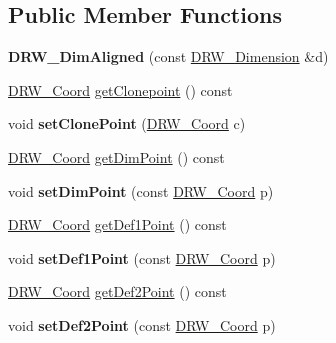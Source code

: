 \subsection*{Public Member Functions}
\begin{DoxyCompactItemize}
\item 
\hypertarget{classDRW__DimAligned_ac5b5e2750a3a6bb946ad2aacf7d8139a}{{\bfseries D\-R\-W\-\_\-\-Dim\-Aligned} (const \hyperlink{classDRW__Dimension}{D\-R\-W\-\_\-\-Dimension} \&d)}\label{classDRW__DimAligned_ac5b5e2750a3a6bb946ad2aacf7d8139a}

\item 
\hyperlink{classDRW__Coord}{D\-R\-W\-\_\-\-Coord} \hyperlink{classDRW__DimAligned_abbd897f18dec2dcded4a6c28ac08ae69}{get\-Clonepoint} () const 
\item 
\hypertarget{classDRW__DimAligned_af0c9c0fe499f3714c19299986e7ced09}{void {\bfseries set\-Clone\-Point} (\hyperlink{classDRW__Coord}{D\-R\-W\-\_\-\-Coord} c)}\label{classDRW__DimAligned_af0c9c0fe499f3714c19299986e7ced09}

\item 
\hyperlink{classDRW__Coord}{D\-R\-W\-\_\-\-Coord} \hyperlink{classDRW__DimAligned_ab59c46ec3dde19b8de90ca9065bc7e89}{get\-Dim\-Point} () const 
\item 
\hypertarget{classDRW__DimAligned_a27e77b4d4e5c1d36c65ddeacba228992}{void {\bfseries set\-Dim\-Point} (const \hyperlink{classDRW__Coord}{D\-R\-W\-\_\-\-Coord} p)}\label{classDRW__DimAligned_a27e77b4d4e5c1d36c65ddeacba228992}

\item 
\hyperlink{classDRW__Coord}{D\-R\-W\-\_\-\-Coord} \hyperlink{classDRW__DimAligned_a3e3a2f5aa773efe06e349355b9ed0b43}{get\-Def1\-Point} () const 
\item 
\hypertarget{classDRW__DimAligned_a47128d3e7c5ead93908fb1ea5d1ce122}{void {\bfseries set\-Def1\-Point} (const \hyperlink{classDRW__Coord}{D\-R\-W\-\_\-\-Coord} p)}\label{classDRW__DimAligned_a47128d3e7c5ead93908fb1ea5d1ce122}

\item 
\hyperlink{classDRW__Coord}{D\-R\-W\-\_\-\-Coord} \hyperlink{classDRW__DimAligned_aef8ab998257cf7ac609b8b3783af9e03}{get\-Def2\-Point} () const 
\item 
\hypertarget{classDRW__DimAligned_acd675001b74fd2b9b772b846e52a58cd}{void {\bfseries set\-Def2\-Point} (const \hyperlink{classDRW__Coord}{D\-R\-W\-\_\-\-Coord} p)}\label{classDRW__DimAligned_acd675001b74fd2b9b772b846e52a58cd}

\end{DoxyCompactItemize}
